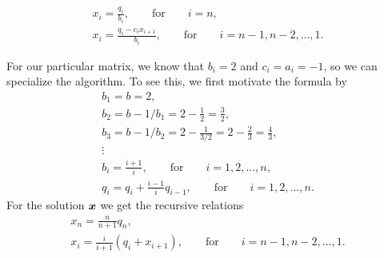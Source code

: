 \documentclass[english,notitlepage]{revtex4-1}  %
\begin{document}
\begin{gather}
	x_i = \frac{q_i}{b_i}, \qquad \text{for} \qquad i = n,\\
	x_i = \frac{q_i - c_ix_{i+1}}{b_i},\qquad \text{for} \qquad i = n-1, n-2, ...,1.
\end{gather}




For our particular matrix, we know that $b_i = 2$ and $c_i = a_i = -1$, so we can specialize the algorithm. To see this, we first motivate the formula by 
\begin{gather}
	b_1 = b = 2, \\
	b_2 = b - 1/b_1 = 2 - \frac{1}{2} = \frac{3}{2},\\
	b_3 = b - 1/b_2 = 2 -\frac{1}{3/2} = 2 - \frac{2}{3} = \frac{4}{3},\\
	\vdots \\
	b_i = \frac{i+1}{i}, \qquad \text{for} \qquad i = 1,2,...,n, \\
	q_i = q_i + \frac{i-1}{i}q_{i-1}, \qquad \text{for} \qquad i = 1,2,...,n.
\end{gather}
For the solution $\vb*{x}$ we get the recursive relations
\begin{gather}
	x_n = \frac{n}{n+1}q_n, \\
	x_i = \frac{i}{i+1}(q_i + x_{i+1}), \qquad \text{for} \qquad i = n-1,n-2,...,1.
\end{gather}
\end{document}
